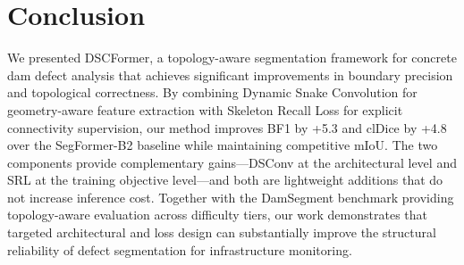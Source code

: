 \documentclass[10pt,twocolumn,letterpaper]{article}
\begin{document}
\section{Conclusion}
\label{sec:conclusion}

We presented DSCFormer, a topology-aware segmentation framework for concrete dam defect analysis that achieves significant improvements in boundary precision and topological correctness. By combining Dynamic Snake Convolution for geometry-aware feature extraction with Skeleton Recall Loss for explicit connectivity supervision, our method improves BF1 by +5.3 and clDice by +4.8 over the SegFormer-B2 baseline while maintaining competitive mIoU. The two components provide complementary gains---DSConv at the architectural level and SRL at the training objective level---and both are lightweight additions that do not increase inference cost. Together with the DamSegment benchmark providing topology-aware evaluation across difficulty tiers, our work demonstrates that targeted architectural and loss design can substantially improve the structural reliability of defect segmentation for infrastructure monitoring.

{\small


}
\end{document}
